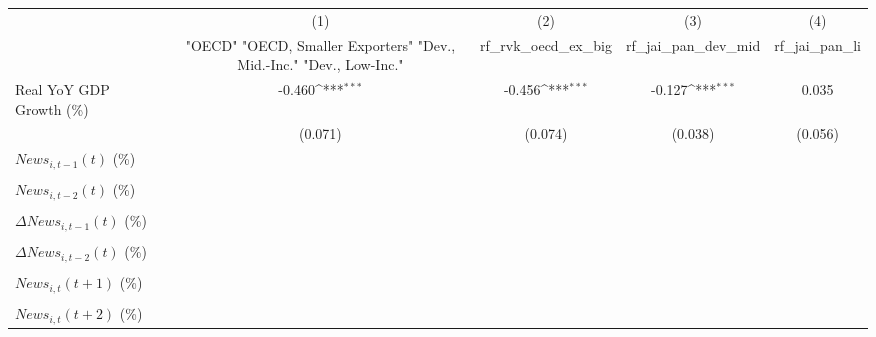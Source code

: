 {
\def\sym#1{\ifmmode^{#1}\else\(^{#1}\)\fi}
\begin{tabular}{l*{4}{c}}
\toprule
                    &\multicolumn{1}{c}{(1)}&\multicolumn{1}{c}{(2)}&\multicolumn{1}{c}{(3)}&\multicolumn{1}{c}{(4)}\\
                    &\multicolumn{1}{c}{ "OECD" "OECD, Smaller Exporters" "Dev., Mid.-Inc." "Dev., Low-Inc."}&\multicolumn{1}{c}{rf_rvk_oecd_ex_big}&\multicolumn{1}{c}{rf_jai_pan_dev_mid}&\multicolumn{1}{c}{rf_jai_pan_li}\\
\midrule
Real YoY GDP Growth (\%)&      -0.460\sym{***}&      -0.456\sym{***}&      -0.127\sym{***}&       0.035         \\
                    &     (0.071)         &     (0.074)         &     (0.038)         &     (0.056)         \\
\addlinespace
$ News_{i,t-1}(t)$ (\%)&                     &                     &                     &                     \\
                    &                     &                     &                     &                     \\
\addlinespace
$ News_{i,t-2}(t)$ (\%)&                     &                     &                     &                     \\
                    &                     &                     &                     &                     \\
\addlinespace
$ \Delta News_{i,t-1}(t)$ (\%)&                     &                     &                     &                     \\
                    &                     &                     &                     &                     \\
\addlinespace
$ \Delta News_{i,t-2}(t)$ (\%)&                     &                     &                     &                     \\
                    &                     &                     &                     &                     \\
\addlinespace
$ News_{i,t}(t+1)$ (\%)&                     &                     &                     &                     \\
                    &                     &                     &                     &                     \\
\addlinespace
$ News_{i,t}(t+2)$ (\%)&                     &                     &                     &                     \\

\end{tabular}}
